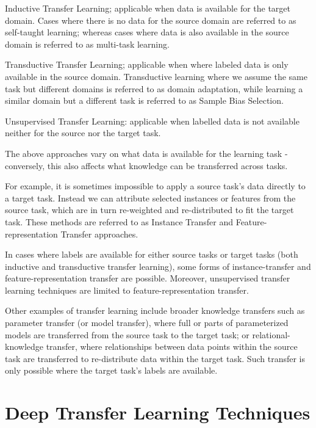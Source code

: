 Inductive Transfer Learning; applicable when data is available for the target domain. Cases where there is no data for the source domain are referred to as self-taught learning; whereas cases where data is also available in the source domain is referred to as multi-task learning.

Transductive Transfer Learning; applicable when where labeled data is only available in the source domain. Transductive learning where we assume the same task but different domains is referred to as domain adaptation, while learning a similar domain but a different task is referred to as Sample Bias Selection.  

Unsupervised Transfer Learning: applicable when labelled data is not available neither for the source nor the target task.

The above approaches vary on what data is available for the learning task - conversely, this also affects what knowledge can be transferred across tasks. 

For example, it is sometimes impossible to apply a source task’s data directly to a target task. Instead we can attribute selected instances or features from the source task, which are in turn re-weighted and re-distributed to fit the target task. These methods are referred to as Instance Transfer and Feature-representation Transfer approaches.

In cases where labels are available for either source tasks or target tasks (both inductive and transductive transfer learning), some forms of instance-transfer and feature-representation transfer are possible. Moreover, unsupervised transfer learning techniques are limited to feature-representation transfer. \citet{panyang2010}

Other examples of transfer learning include broader knowledge transfers such as parameter transfer (or model transfer), where full or parts of parameterized models are transferred from the source task to the target task; or relational-knowledge transfer, where relationships between data points within the source task are transferred to re-distribute data within the target task. Such transfer is only possible where the target task’s labels are available.\citet{cook2013} \citet{panyang2010}

\section{Deep Transfer Learning Techniques}\label{sec:transfer-learning-deep-techniques}

